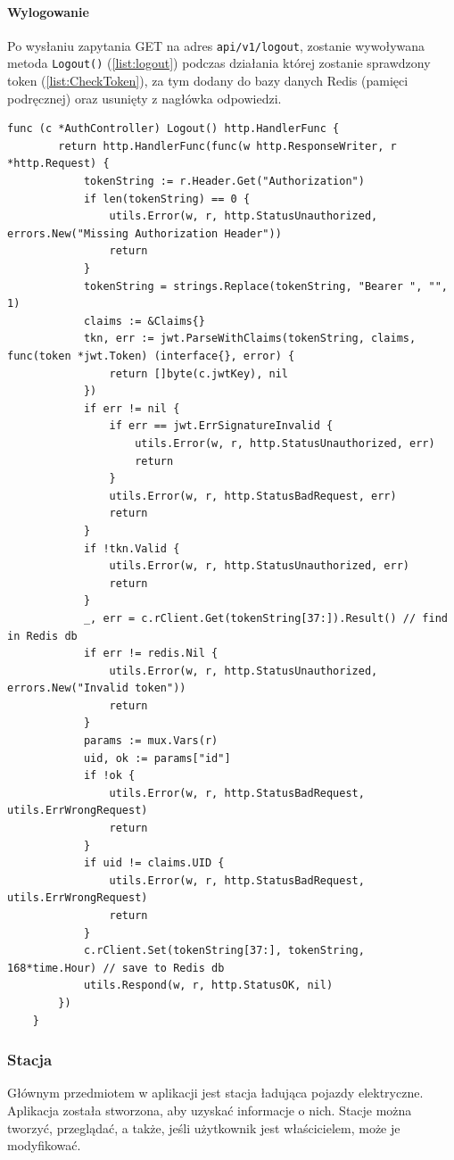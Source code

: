 \paragraph{Wylogowanie\newline}
Po wysłaniu zapytania GET na adres \texttt{api/v1/logout}, zostanie wywoływana metoda \texttt{Logout()} (\ref{list:logout}) podczas działania której zostanie sprawdzony token (\ref{list:CheckToken}), za tym dodany do bazy danych Redis (pamięci podręcznej) oraz usunięty z nagłówka odpowiedzi.
\begin{lstlisting}[label=list:logout,caption=Wylogowanie,basicstyle=\tiny\ttfamily]
    func (c *AuthController) Logout() http.HandlerFunc {
        return http.HandlerFunc(func(w http.ResponseWriter, r *http.Request) {
            tokenString := r.Header.Get("Authorization")
            if len(tokenString) == 0 {
                utils.Error(w, r, http.StatusUnauthorized, errors.New("Missing Authorization Header"))
                return
            }
            tokenString = strings.Replace(tokenString, "Bearer ", "", 1)
            claims := &Claims{}
            tkn, err := jwt.ParseWithClaims(tokenString, claims, func(token *jwt.Token) (interface{}, error) {
                return []byte(c.jwtKey), nil
            })
            if err != nil {
                if err == jwt.ErrSignatureInvalid {
                    utils.Error(w, r, http.StatusUnauthorized, err)
                    return
                }
                utils.Error(w, r, http.StatusBadRequest, err)
                return
            }
            if !tkn.Valid {
                utils.Error(w, r, http.StatusUnauthorized, err)
                return
            }
            _, err = c.rClient.Get(tokenString[37:]).Result() // find in Redis db
            if err != redis.Nil {
                utils.Error(w, r, http.StatusUnauthorized, errors.New("Invalid token"))
                return
            }
            params := mux.Vars(r)
            uid, ok := params["id"]
            if !ok {
                utils.Error(w, r, http.StatusBadRequest, utils.ErrWrongRequest)
                return
            }
            if uid != claims.UID {
                utils.Error(w, r, http.StatusBadRequest, utils.ErrWrongRequest)
                return
            }
            c.rClient.Set(tokenString[37:], tokenString, 168*time.Hour) // save to Redis db
            utils.Respond(w, r, http.StatusOK, nil)
        })
    }
\end{lstlisting}

\subsubsection{Stacja}
Głównym przedmiotem w aplikacji jest stacja ładująca pojazdy elektryczne. Aplikacja została stworzona, aby uzyskać informacje o nich. Stacje można tworzyć, przeglądać, a także, jeśli użytkownik jest właścicielem, może je modyfikować.


